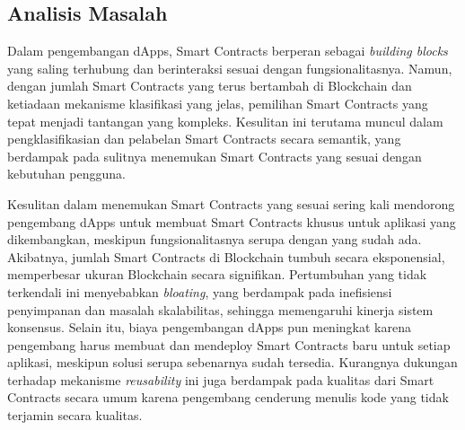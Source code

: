 \subsection{Analisis Masalah}
\label{subsec:analisis-masalah}

Dalam pengembangan dApps, Smart Contracts berperan sebagai \textit{building blocks} yang saling terhubung dan berinteraksi sesuai dengan fungsionalitasnya. Namun, dengan jumlah Smart Contracts yang terus bertambah di Blockchain dan ketiadaan mekanisme klasifikasi yang jelas, pemilihan Smart Contracts yang tepat menjadi tantangan yang kompleks. Kesulitan ini terutama muncul dalam pengklasifikasian dan pelabelan Smart Contracts secara semantik, yang berdampak pada sulitnya menemukan Smart Contracts yang sesuai dengan kebutuhan pengguna.

Kesulitan dalam menemukan Smart Contracts yang sesuai sering kali mendorong pengembang dApps untuk membuat Smart Contracts khusus untuk aplikasi yang dikembangkan, meskipun fungsionalitasnya serupa dengan yang sudah ada. Akibatnya, jumlah Smart Contracts di Blockchain tumbuh secara eksponensial, memperbesar ukuran Blockchain secara signifikan. Pertumbuhan yang tidak terkendali ini menyebabkan \textit{bloating}, yang berdampak pada inefisiensi penyimpanan dan masalah skalabilitas, sehingga memengaruhi kinerja sistem konsensus. Selain itu, biaya pengembangan dApps pun meningkat karena pengembang harus membuat dan mendeploy Smart Contracts baru untuk setiap aplikasi, meskipun solusi serupa sebenarnya sudah tersedia. Kurangnya dukungan terhadap mekanisme \textit{reusability} ini juga berdampak pada kualitas dari Smart Contracts secara umum karena pengembang cenderung menulis kode yang tidak terjamin secara kualitas.







% 

